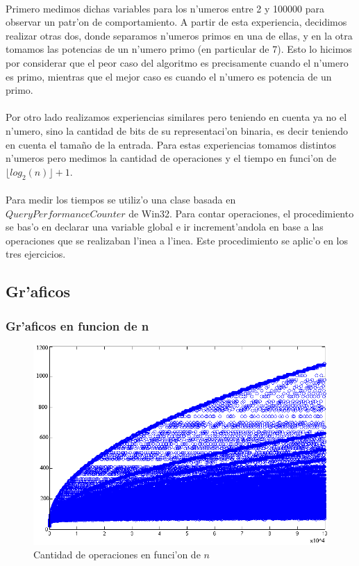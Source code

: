 \paragraph{}
Primero medimos dichas variables para los n'umeros entre 2 y 100000 para observar un patr'on de comportamiento. 
A partir de esta experiencia, decidimos realizar otras dos, donde separamos n'umeros primos en una de ellas, y en 
la otra tomamos las potencias de un n'umero primo (en particular de 7). Esto lo hicimos por considerar que el peor caso
del algoritmo es precisamente cuando el n'umero es primo, mientras que el mejor caso es cuando el n'umero es 
potencia de un primo. 
\paragraph{}
Por otro lado realizamos experiencias similares pero teniendo en cuenta ya no el n'umero, sino la cantidad de bits 
de su representaci'on binaria, es decir teniendo en cuenta el tama\~{n}o de la entrada. Para estas experiencias 
tomamos distintos n'umeros pero medimos la cantidad de operaciones y el tiempo en funci'on de $\lfloor log_2(n) \rfloor + 1$.
\paragraph{}
Para medir los tiempos se utiliz'o una clase basada en $QueryPerformanceCounter$ de Win32. Para contar operaciones, 
el procedimiento se bas'o en declarar una variable global e ir increment'andola en base a las operaciones que se 
realizaban l'inea a l'inea. Este procedimiento se aplic'o en los tres ejercicios.

\subsection{Gr'aficos}
\subsubsection{Gr'aficos en funcion de n}

\begin{figure}[H]
\centering
\includegraphics[scale=0.7]{../../codigo/ejercicio1/benchmark/graficos/todos_los_numeros/graficosTodos.png}
\caption{Cantidad de operaciones en funci'on de $n$}
\label{Ej1fig1}
\end{figure}

